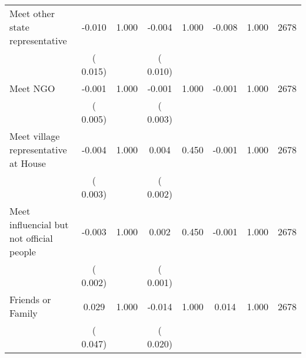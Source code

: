 \begin{tabular}{l*{7}{c}}
 Meet other state representative       &             -0.010       &        1.000  &             -0.004       &        1.000  &             -0.008       &              1.000 &  2678 \\ 
                       &       (       0.015)             &                               &       (       0.010)                     &                               &                                               &                                &                      \\ 

 Meet NGO       &             -0.001       &        1.000  &             -0.001       &        1.000  &             -0.001       &              1.000 &  2678 \\ 
                       &       (       0.005)             &                               &       (       0.003)                     &                               &                                               &                                &                      \\ 

 Meet village representative at House       &             -0.004       &        1.000  &              0.004       &        0.450  &             -0.001       &              1.000 &  2678 \\ 
                       &       (       0.003)             &                               &       (       0.002)                     &                               &                                               &                                &                      \\ 

 Meet influencial but not official people       &             -0.003       &        1.000  &              0.002       &        0.450  &             -0.001       &              1.000 &  2678 \\ 
                       &       (       0.002)             &                               &       (       0.001)                     &                               &                                               &                                &                      \\ 

 Friends or Family       &              0.029       &        1.000  &             -0.014       &        1.000  &              0.014       &              1.000 &  2678 \\ 
                       &       (       0.047)             &                               &       (       0.020)                     &                               &                                               &                                &                      \\ 


\end{tabular}
